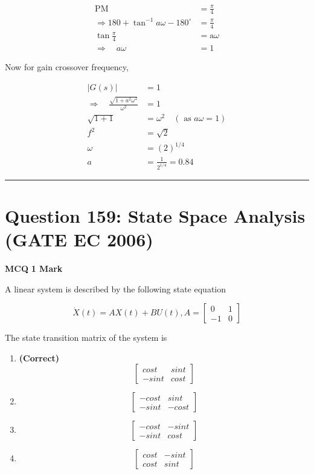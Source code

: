 \documentclass[11pt,a4paper]{article}
\begin{document}
\begin{tcolorbox}[solbox, title=Detailed Solution -- Question 158]
\[
\begin{aligned} \mathrm{PM}&=\frac{\pi}{4} \\ \Rightarrow 180+\tan ^{-1} a \omega-180^{\circ}&=\frac{\pi}{4} \\ \tan \frac{\pi}{4}&=\mathrm{a} \omega \\ \Rightarrow\quad a \omega&=1 \end{aligned}
\]

 Now for gain crossover frequency,

\[
\begin{aligned} |G(s)|&=1 \\ \Rightarrow \quad \frac{\sqrt{1+a^{2} \omega^{2}}}{\omega^{2}}&=1 \\ \sqrt{1+1}&=\omega^{2} \quad(\text { as } a \omega=1) \\ f^{2}&=\sqrt{2} \\ \omega&=(2)^{1 / 4} \\ a&=\frac{1}{2^{1 / 4}}=0.84 \end{aligned}
\]
\end{tcolorbox}

\vspace{1.5em}
\hrule
\vspace{1.5em}

\section*{Question 159: State Space Analysis (GATE EC 2006)}
\noindent \textbf{\color{primary}MCQ} \hfill \textbf{\color{secondary}1 Mark}


\noindent A linear system is described by the following state equation 

\[
\dot{X}(t)=AX(t)+BU(t),A=\begin{bmatrix} 0 & 1\\ -1&0 \end{bmatrix}
\]

 The state transition matrix of the system is


\begin{enumerate}[label=(\Alph*)]
    \item \textbf{(Correct)} \[
\begin{bmatrix} cost & sint\\ -sint & cost \end{bmatrix}
\]
    \item \[
\begin{bmatrix} -cost & sint\\ -sint & -cost \end{bmatrix}
\]
    \item \[
\begin{bmatrix} -cost & -sint\\ -sint & cost \end{bmatrix}
\]
    \item \[
\begin{bmatrix} cost & -sint\\ cost & sint \end{bmatrix}
\]
\end{enumerate}
\end{document}
